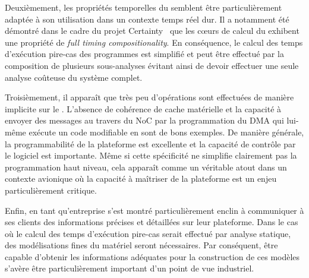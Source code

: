 \documentclass[main.tex]{subfiles}
\begin{document}
Deuxièmement, les propriétés temporelles du \mppalong semblent être particulièrement adaptée à son utilisation dans un contexte temps réel dur. Il a notamment été démontré dans le cadre du projet {\sc Certainty}~\cite{Certainty} que les c\oe{}urs de calcul du \mppalong exhibent une propriété de \emph{full timing compositionality}. En conséquence, le calcul des temps d'exécution pire-cas des programmes est simplifié et peut être effectué par la composition de plusieurs sous-analyses évitant ainsi de devoir effectuer une seule analyse coûteuse du système complet.

Troisièmement, il apparaît que très peu d'opérations sont effectuées de manière implicite sur le \mppalong. L'absence de cohérence de cache matérielle et la capacité à envoyer des messages au travers du NoC par la programmation du DMA qui lui-même exécute un code modifiable en sont de bons exemples. De manière générale, la programmabilité de la plateforme est excellente et la capacité de contrôle par le logiciel est importante. Même si cette spécificité ne simplifie clairement pas la programmation haut niveau, cela apparaît comme un véritable atout dans un contexte avionique où la capacité à maîtriser de la plateforme est un enjeu particulièrement critique.

Enfin, \kalray en tant qu'entreprise s'est montré particulièrement enclin à communiquer à ses clients des informations précises et détaillées sur leur plateforme. Dans le cas où le calcul des temps d'exécution pire-cas serait effectué par analyse statique, des modélisations fines du matériel seront nécessaires. Par conséquent, être capable d'obtenir les informations adéquates pour la construction de ces modèles s'avère être particulièrement important d'un point de vue industriel.

\end{document}
